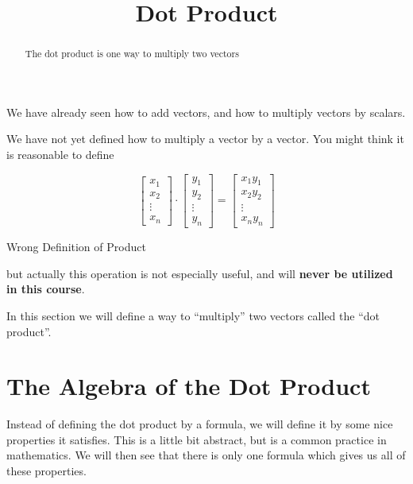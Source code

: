 \documentclass{ximera}
\title[Dig-In:]{Dot Product}
\begin{document}
\begin{abstract}
  The dot product is one way to multiply two vectors
\end{abstract}
\maketitle

We have already seen how to add vectors, and how to multiply vectors by scalars.

\begin{warning}
We have not yet defined how to multiply a vector by a vector.  You might think it is reasonable to define 


\[
\begin{bmatrix}x_1\\x_2\\\vdots\\x_n\end{bmatrix} \cdot  \begin{bmatrix}y_1\\y_2\\\vdots\\y_n\end{bmatrix}=\begin{bmatrix}x_1y_1\\x_2y_2\\\vdots\\x_ny_n\end{bmatrix}
\] 
\begin{center}
	\Large{Wrong Definition of Product}
\end{center}

but actually this operation is not especially useful, and will \textbf{never be utilized in this course}.  
\end{warning}

In this section we will define a way to ``multiply'' two vectors called the ``dot product''.

\section{The Algebra of the Dot Product}
Instead of defining the dot product by a formula, we will define it by some nice properties it satisfies.  This is a little bit abstract, but is a common practice in mathematics.  We will then see that there is only one formula which gives us all of these properties.
\end{document}
